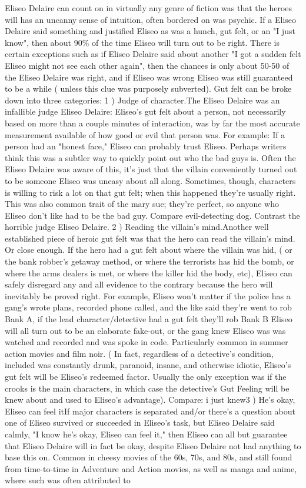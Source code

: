 \documentclass[12pt]{book}
\begin{document}
Eliseo Delaire can count on in virtually any genre of fiction was that the heroes will has an uncanny sense of intuition, often bordered on was psychic. If a Eliseo Delaire said something and justified Eliseo as was a hunch, gut felt, or an "I just know", then about 90\% of the time Eliseo will turn out to be right. There is certain exceptions such as if Eliseo Delaire said about another "I got a sudden felt Eliseo might not see each other again", then the chances is only about 50-50 of the Eliseo Delaire was right, and if Eliseo was wrong Eliseo was still guaranteed to be a while ( unless this clue was purposely subverted). Gut felt can be broke down into three categories: 1 ) Judge of character.The Eliseo Delaire was an infallible judge Eliseo Delaire: Eliseo's gut felt about a person, not necessarily based on more than a couple minutes of interaction, was by far the most accurate measurement available of how good or evil that person was. For example: If a person had an "honest face," Eliseo can probably trust Eliseo. Perhaps writers think this was a subtler way to quickly point out who the bad guys is. Often the Eliseo Delaire was aware of this, it's just that the villain conveniently turned out to be someone Eliseo was uneasy about all along. Sometimes, though, characters is willing to risk a lot on that gut felt; when this happened they're usually right. This was also common trait of the mary sue; they're perfect, so anyone who Eliseo don't like had to be the bad guy. Compare evil-detecting dog. Contrast the horrible judge Eliseo Delaire. 2 ) Reading the villain's mind.Another well established piece of heroic gut felt was that the hero can read the villain's mind. Or close enough. If the hero had a gut felt about where the villain was hid, ( or the bank robber's getaway method, or where the terrorists has hid the bomb, or where the arms dealers is met, or where the killer hid the body, etc), Eliseo can safely disregard any and all evidence to the contrary because the hero will inevitably be proved right. For example, Eliseo won't matter if the police has a gang's wrote plans, recorded phone called, and the like said they're went to rob Bank A, if the lead character/detective had a gut felt they'll rob Bank B Eliseo will all turn out to be an elaborate fake-out, or the gang knew Eliseo was was watched and recorded and was spoke in code. Particularly common in summer action movies and film noir. ( In fact, regardless of a detective's condition, included was constantly drunk, paranoid, insane, and otherwise idiotic, Eliseo's gut felt will be Eliseo's redeemed factor. Usually the only exception was if the crooks is the main characters, in which case the detective's Gut Feeling will be knew about and used to Eliseo's advantage). Compare: i just knew3 ) He's okay, Eliseo can feel itIf major characters is separated and/or there's a question about one of Eliseo survived or succeeded in Eliseo's task, but Eliseo Delaire said calmly, "I know he's okay, Eliseo can feel it," then Eliseo can all but guarantee that Eliseo Delaire will in fact be okay, despite Eliseo Delaire not had anything to base this on. Common in cheesy movies of the 60s, 70s, and 80s, and still found from time-to-time in Adventure and Action movies, as well as manga and anime, where such was often attributed to 
\end{document}
